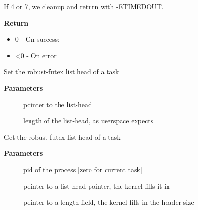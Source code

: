 \documentclass[a4paper,8pt,english]{sphinxmanual}
\begin{document}
If 4 or 7, we cleanup and return with -ETIMEDOUT.

\textbf{Return}
\begin{itemize}
\item {} 
0 - On success;

\item {} 
\textless{}0 - On error

\end{itemize}

\begin{fulllineitems}
\label{kernel-hacking/locking:c.sys_set_robust_list}
Set the robust-futex list head of a task

\end{fulllineitems}


\textbf{Parameters}
\begin{description}
\item[{}] \leavevmode
pointer to the list-head

\item[{}] \leavevmode
length of the list-head, as userspace expects

\end{description}

\begin{fulllineitems}
\label{kernel-hacking/locking:c.sys_get_robust_list}
Get the robust-futex list head of a task

\end{fulllineitems}


\textbf{Parameters}
\begin{description}
\item[{}] \leavevmode
pid of the process {[}zero for current task{]}

\item[{}] \leavevmode
pointer to a list-head pointer, the kernel fills it in

\item[{}] \leavevmode
pointer to a length field, the kernel fills in the header size

\end{description}
\end{document}
